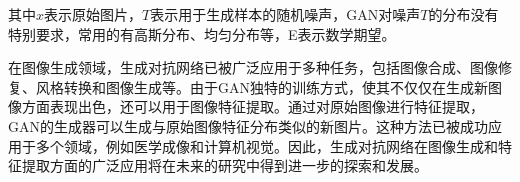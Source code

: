 其中$x$表示原始图片，$T$表示用于生成样本的随机噪声，GAN对噪声$T$的分布没有特别要求，常用的有高斯分布、均匀分布等，E表示数学期望。

在图像生成领域，生成对抗网络已被广泛应用于多种任务\cite{chen2022generative,singh2021medical,zhou2023hybrid}，包括图像合成、图像修复、风格转换和图像生成等。由于GAN独特的训练方式，使其不仅仅在生成新图像方面表现出色，还可以用于图像特征提取\cite{xu2022te}。通过对原始图像进行特征提取，GAN的生成器可以生成与原始图像特征分布类似的新图片。这种方法已被成功应用于多个领域，例如医学成像和计算机视觉。因此，生成对抗网络在图像生成和特征提取方面的广泛应用将在未来的研究中得到进一步的探索和发展。

%
%
%
%
%	
%	
%	
%
%
%
